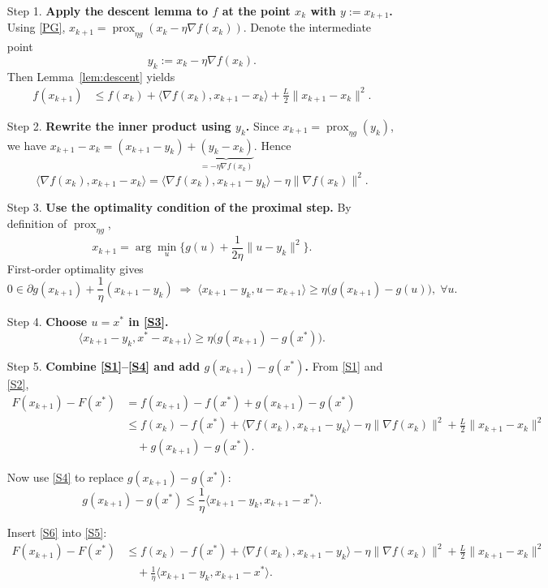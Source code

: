 \documentclass{article}
\newcommand{\prox}{\operatorname{prox}}
\begin{document}
\begin{enumerate}
\item[Step 1.] \textbf{Apply the descent lemma to $f$ at the point $x_{k}$ with $y:=x_{k+1}$.}
Using \eqref{PG}, $x_{k+1}= \prox_{\eta g}(x_{k}-\eta\nabla f(x_{k}))$. Denote the intermediate point
\[
y_{k}:=x_{k}-\eta\nabla f(x_{k}).
\]
Then Lemma~\ref{lem:descent} yields
\begin{align}
f(x_{k+1})
&\le f(x_{k})+\langle\nabla f(x_{k}),x_{k+1}-x_{k}\rangle+\frac{L}{2}\|x_{k+1}-x_{k}\|^{2}.
\tag{S1}
\end{align}

\item[Step 2.] \textbf{Rewrite the inner product using $y_{k}$.}
Since $x_{k+1}= \prox_{\eta g}(y_{k})$, we have $x_{k+1}-x_{k}= (x_{k+1}-y_{k})+\underbrace{(y_{k}-x_{k})}_{=-\eta\nabla f(x_{k})}$. Hence
\[
\langle\nabla f(x_{k}),x_{k+1}-x_{k}\rangle
= \langle\nabla f(x_{k}),x_{k+1}-y_{k}\rangle-\eta\|\nabla f(x_{k})\|^{2}.
\tag{S2}
\]

\item[Step 3.] \textbf{Use the optimality condition of the proximal step.}
By definition of $\prox_{\eta g}$,
\[
x_{k+1}= \arg\min_{u}\Big\{ g(u)+\frac{1}{2\eta}\|u-y_{k}\|^{2}\Big\}.
\]
First‑order optimality gives
\[
0\in \partial g(x_{k+1})+\frac{1}{\eta}(x_{k+1}-y_{k})
\;\Longrightarrow\;
\langle x_{k+1}-y_{k},u-x_{k+1}\rangle\ge \eta\bigl(g(x_{k+1})-g(u)\bigr),\;\forall u.
\tag{S3}
\]

\item[Step 4.] \textbf{Choose $u=x^{*}$ in \eqref{S3}.}
\[
\langle x_{k+1}-y_{k},x^{*}-x_{k+1}\rangle\ge \eta\bigl(g(x_{k+1})-g(x^{*})\bigr).
\tag{S4}
\]

\item[Step 5.] \textbf{Combine \eqref{S1}–\eqref{S4} and add $g(x_{k+1})-g(x^{*})$.}
From \eqref{S1} and \eqref{S2},
\[
\begin{aligned}
F(x_{k+1})-F(x^{*})
&=f(x_{k+1})-f(x^{*})+g(x_{k+1})-g(x^{*})\\
&\le f(x_{k})-f(x^{*})
   +\langle\nabla f(x_{k}),x_{k+1}-y_{k}\rangle
   -\eta\|\nabla f(x_{k})\|^{2}
   +\frac{L}{2}\|x_{k+1}-x_{k}\|^{2}\\
&\quad +g(x_{k+1})-g(x^{*}).
\end{aligned}
\tag{S5}
\]

Now use \eqref{S4} to replace $g(x_{k+1})-g(x^{*})$:
\[
g(x_{k+1})-g(x^{*})
\le \frac{1}{\eta}\langle x_{k+1}-y_{k},x_{k+1}-x^{*}\rangle .
\tag{S6}
\]

Insert \eqref{S6} into \eqref{S5}:
\[
\begin{aligned}
F(x_{k+1})-F(x^{*})
&\le f(x_{k})-f(x^{*})
   +\langle\nabla f(x_{k}),x_{k+1}-y_{k}\rangle
   -\eta\|\nabla f(x_{k})\|^{2}
   +\frac{L}{2}\|x_{k+1}-x_{k}\|^{2}\\
&\quad +\frac{1}{\eta}\langle x_{k+1}-y_{k},x_{k+1}-x^{*}\rangle .
\end{aligned}
\tag{S7}
\]


\end{enumerate}
\end{document}
